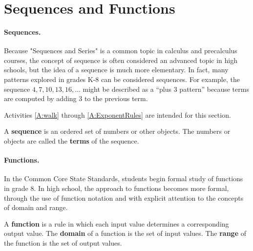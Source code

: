 \section{Sequences and Functions}
\paragraph{Sequences.}  Because "Sequences and Series" is a common topic in calculus and precalculus courses, the concept of sequence is often considered an advanced topic in high schools, but the idea of a sequence is much more elementary.  In fact, many patterns explored in grades K-8 can be considered sequences.  For example, the sequence $4, 7, 10, 13, 16, \dots$ might be described as a ``plus 3 pattern'' because terms are computed by adding 3 to the previous term.  
\begin{activitynote}
Activities \ref{A:walk} through \ref{A:ExponentRules} are intended for this section.  
\end{activitynote}
\begin{definition}
A \textbf{sequence} is an ordered set of numbers or other objects.  The numbers or objects are called the \textbf{terms} of the sequence.  
\end{definition}

\paragraph{Functions.}  In the Common Core State Standards, students begin formal study of functions in grade 8.  
In high school, the approach to functions becomes more formal, through the use of function notation and with explicit attention to the concepts of domain and range.   

\begin{definition}
A \textbf{function} is a rule in which each input value determines a corresponding output value.  The \textbf{domain} of a function is the set of input values.  The \textbf{range} of the function is the set of output values.
\end{definition}

